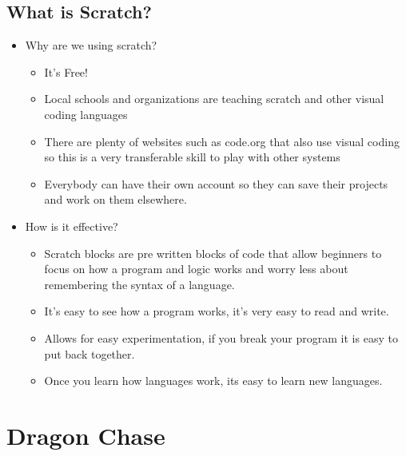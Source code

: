 \documentclass[12pt]{article}
\begin{document}
\subsection*{What is Scratch?}
	\begin{itemize}
		\item Why are we using scratch?
		\begin{itemize}
			\item It's Free!
			\item Local schools and organizations are teaching scratch and other visual coding languages
			\item There are plenty of websites such as code.org that also use visual coding so this is a very transferable skill to play with other systems
			\item Everybody can have their own account so they can save their projects and work on them elsewhere.
		\end{itemize}
		\item How is it effective?
		\begin{itemize}
			\item Scratch blocks are pre written blocks of code that allow beginners to focus on how a program and logic works and worry less about remembering the syntax of a language.
			\item It's easy to see how a program works, it's very easy to read and write.
			\item Allows for easy experimentation, if you break your program it is easy to put back together.
			\item Once you learn how languages work, its easy to learn new languages.
		\end{itemize}
	\end{itemize}






\section*{Dragon Chase}
\end{document}

